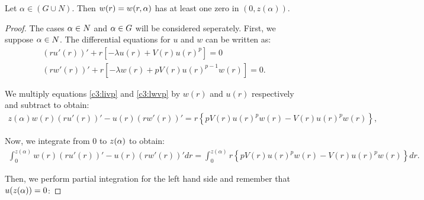 \begin{lemma}\label{genlem3}
Let $\alpha\in (G\cup N).$ Then $w(r)=w(r,\alpha)$ has at least one zero in $(0,z(\alpha))$.
\end{lemma}
\begin{proof}
The cases $\alpha\in N$ and $\alpha\in G$ will be considered seperately. First, we
suppose $\alpha\in N$. The differential equations for $u$ and $w$ can be written as:
\begin{gather}
\label{c3:livp}  (ru'(r))'+r\left[-\lambda u(r)+V(r)u(r)^p\right]=0\\
\label{c3:lwvp}  (rw'(r))'+r\left[-\lambda w(r)+pV(r)u(r)^{p-1}w(r)\right]=0.
\end{gather}


We multiply equations \eqref{c3:livp} and \eqref{c3:lwvp} by $w(r)$ and $u(r)$
respectively and subtract to obtain:
\begin{gather*}
	z(\alpha)w(r)(ru'(r))'-u(r)(rw'(r))'=r\left\{pV(r)u(r)^pw(r)-V(r)u(r)^pw(r)\right\},
\end{gather*}

Now, we integrate from $0$ to $z(\alpha)$ to obtain: 
\begin{gather*}
  \int_0^{z(\alpha)}w(r)(ru'(r))'-u(r)(rw'(r))'dr=
  \int_0^{z(\alpha)}r\left\{pV(r)u(r)^pw(r)-V(r)u(r)^pw(r)\right\}dr.
\end{gather*}

Then, we perform partial integration for the left hand side and remember
that $u(z(\alpha))=0$:

\end{proof}

